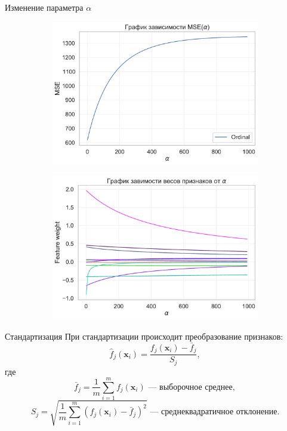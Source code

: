 \documentclass{beamer} %
\begin{document}
\begin{frame}{Изменение параметра $\alpha$}
\begin{figure}
\begin{subfigure}[b]{0.475\textwidth}
                \includegraphics[width=\textwidth]{MSE_plot.pdf}
            \end{subfigure}
            \hfill
            \begin{subfigure}[b]{0.475\textwidth}   
                \centering 
                \includegraphics[width=\textwidth]{feature_plot.pdf}
            \end{subfigure} 
        \end{figure}
    \end{frame}

    \begin{frame}{Стандартизация}
        При стандартизации происходит преобразование признаков:
        \[ \hat{f}_j(\bm{x}_i) = \dfrac{f_j(\bm{x}_i) - \bar{f}_j}{S_j}, \]
        где 
        \[ \bar{f}_j = \dfrac{1}{m} \sum\limits_{i = 1}^m f_j(\bm{x}_i) \text{~--- выборочное среднее}, \]
        \[ S_j = \sqrt{\dfrac{1}{m} \sum\limits_{i=1}^m (f_j(\bm{x}_i) - \bar{f}_j)^2} \text{~--- среднеквадратичное отклонение}. \]
    \end{frame}
\end{document}
